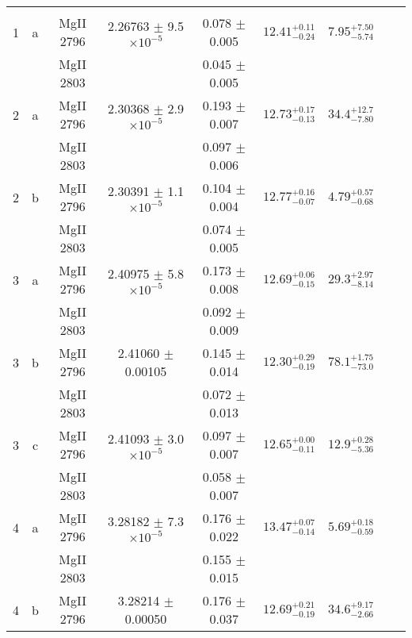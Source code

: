 \documentclass[12pt]{article}
\begin{document}
\begin{footnotesize}
\begin{longtable}{ c c c c c c c c c}
\hline                                                                                                                                                   
		&	   &                           &            & 	& 					&							  	& \\                                                                 
       1  & a  & MgII     2796  &  2.26763 $\pm$ 9.5 $\times 10^{-5}$   &  0.078 $\pm$ 0.005   & $12.41_{ - 0.24}^{ + 0.11}$  & $7.95_{ - 5.74}^{ + 7.50}$    & 	 & \\ 
  &   & MgII     2803  &  &  0.045 $\pm$ 0.005   &   &     & 	 & \\ 
       2  & a  & MgII     2796  &  2.30368 $\pm$ 2.9 $\times 10^{-5}$   &  0.193 $\pm$ 0.007   & $12.73_{ - 0.13}^{ + 0.17}$  & $34.4_{ - 7.80}^{ + 12.7}$    & 	 & \\ 
  &   & MgII     2803  &  &  0.097 $\pm$ 0.006   &   &     & 	 & \\ 
       2  & b  & MgII     2796  &  2.30391 $\pm$ 1.1 $\times 10^{-5}$   &  0.104 $\pm$ 0.004   & $12.77_{ - 0.07}^{ + 0.16}$  & $4.79_{ - 0.68}^{ + 0.57}$    & 	 & \\ 
  &   & MgII     2803  &  &  0.074 $\pm$ 0.005   &   &     & 	 & \\ 
       3  & a  & MgII     2796  &  2.40975 $\pm$ 5.8 $\times 10^{-5}$   &  0.173 $\pm$ 0.008   & $12.69_{ - 0.15}^{ + 0.06}$  & $29.3_{ - 8.14}^{ + 2.97}$    & 	 & \\ 
  &   & MgII     2803  &  &  0.092 $\pm$ 0.009   &   &     & 	 & \\ 
       3  & b  & MgII     2796  &  2.41060 $\pm$ 0.00105  &  0.145 $\pm$ 0.014   & $12.30_{ - 0.19}^{ + 0.29}$  & $78.1_{ - 73.0}^{ + 1.75}$    & 	 & \\ 
  &   & MgII     2803  &  &  0.072 $\pm$ 0.013   &   &     & 	 & \\ 
       3  & c  & MgII     2796  &  2.41093 $\pm$ 3.0 $\times 10^{-5}$   &  0.097 $\pm$ 0.007   & $12.65_{ - 0.11}^{ + 0.00}$  & $12.9_{ - 5.36}^{ + 0.28}$    & 	 & \\ 
  &   & MgII     2803  &  &  0.058 $\pm$ 0.007   &   &     & 	 & \\ 
       4  & a  & MgII     2796  &  3.28182 $\pm$ 7.3 $\times 10^{-5}$   &  0.176 $\pm$ 0.022   & $13.47_{ - 0.14}^{ + 0.07}$  & $5.69_{ - 0.59}^{ + 0.18}$    & 	 & \\ 
  &   & MgII     2803  &  &  0.155 $\pm$ 0.015   &   &     & 	 & \\ 
       4  & b  & MgII     2796  &  3.28214 $\pm$ 0.00050  &  0.176 $\pm$ 0.037   & $12.69_{ - 0.19}^{ + 0.21}$  & $34.6_{ - 2.66}^{ + 9.17}$    & 	 & \\ 

\end{longtable}
\end{footnotesize}
\end{document}
